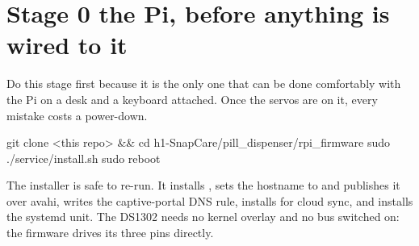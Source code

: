 \documentclass[11pt,a4paper]{article}
\begin{document}
\clearpage

\section{Stage 0 \textemdash{} the Pi, before anything is wired to it}

Do this stage first because it is the only one that can be done comfortably with
the Pi on a desk and a keyboard attached. Once the servos are on it, every
mistake costs a power-down.

\begin{center}
\end{center}

\begin{shell}
git clone <this repo> && cd h1-SnapCare/pill_dispenser/rpi_firmware
sudo ./service/install.sh
sudo reboot
\end{shell}

The installer is safe to re-run. It installs , sets the
hostname to  and publishes it over avahi, writes the
captive-portal DNS rule, installs  for cloud sync,
and installs the systemd unit. The DS1302 needs no kernel overlay and no bus
switched on: the firmware drives its three pins directly.
\end{document}
